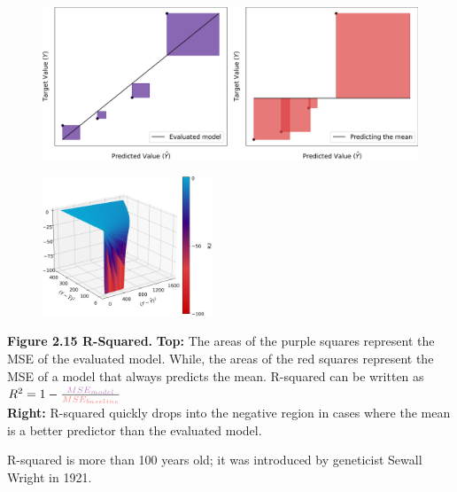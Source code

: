 \clearpage
\thispagestyle{customstyle2}


\begin{figure}[ht!]
    \centering
    \includegraphics[width=\textwidth]{figures/R2_explained.png}
    \label{fig1}
\end{figure}

\begin{figure}
    \centering
    \vspace{-10pt} %
    \includegraphics[width=0.45\textwidth]{figures/R2_3d_surface.png} %
    \vspace{-10pt} %
\end{figure}

\textbf{Figure 2.15 R-Squared.} \textbf{Top:} The
areas of the purple squares
represent the MSE of the
evaluated model. While, the areas
of the red squares represent the
MSE of a model that always
predicts the mean. R-squared
can be written as $R^2 = 1-\frac{\color{violet!50}MSE_{model}}{\color{red!50}MSE_{baseline}}$\\
\textbf{Right:} R-squared quickly drops
into the negative region in cases
where the mean is a better
predictor than the evaluated
model.


{
R-squared is more than 100 years old; it was introduced by geneticist Sewall Wright in 1921.
}


